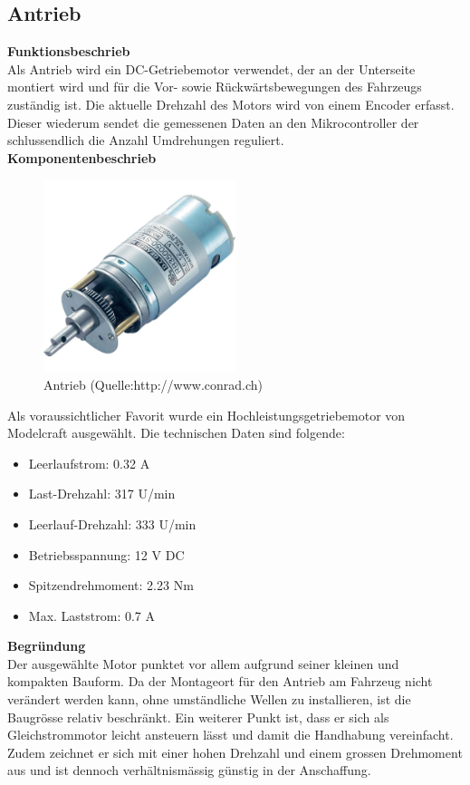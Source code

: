 \subsection{Antrieb}
\textbf{Funktionsbeschrieb}\\[0.2cm]
Als Antrieb wird ein DC-Getriebemotor verwendet, der an der Unterseite montiert wird und für die Vor- sowie Rückwärtsbewegungen des Fahrzeugs zuständig ist.
Die aktuelle Drehzahl des Motors wird von einem Encoder erfasst. Dieser wiederum sendet die gemessenen Daten an den Mikrocontroller der schlussendlich die Anzahl Umdrehungen reguliert.\\[0.2cm]
\textbf{Komponentenbeschrieb}
\begin{figure}[H]
\centering
\includegraphics[width=0.5\textwidth]{03_Loesungskonzept/pictures/antrieb.jpg}
\caption{Antrieb (Quelle:http://www.conrad.ch)}	
\end{figure}
Als voraussichtlicher Favorit wurde ein Hochleistungsgetriebemotor von Modelcraft ausgewählt. Die technischen Daten sind folgende:
\begin{itemize}
\item Leerlaufstrom: 0.32 A
\item Last-Drehzahl: 317 U/min
\item Leerlauf-Drehzahl: 333 U/min
\item Betriebsspannung: 12 V DC
\item Spitzendrehmoment: 2.23 Nm
\item Max. Laststrom: 0.7 A
\end{itemize}
\textbf{Begründung}\\[0.2cm]
Der ausgewählte Motor punktet vor allem aufgrund seiner kleinen und kompakten Bauform. Da der Montageort für den Antrieb am Fahrzeug nicht verändert werden kann, ohne umständliche Wellen zu installieren, ist die Baugrösse relativ beschränkt.
Ein weiterer Punkt ist, dass er sich als Gleichstrommotor leicht ansteuern lässt und damit die Handhabung vereinfacht.
Zudem zeichnet er sich mit einer hohen Drehzahl und einem grossen Drehmoment aus und ist dennoch verhältnismässig günstig in der Anschaffung.
